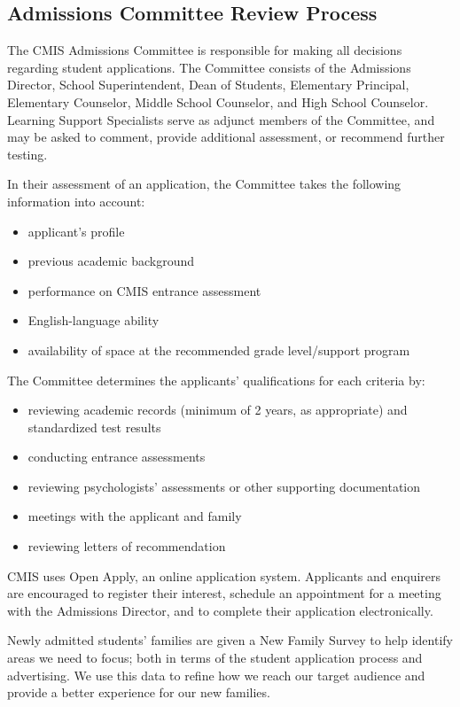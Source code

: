 \subsection{Admissions Committee Review Process}

The CMIS Admissions Committee is responsible for making all decisions regarding student applications. The Committee consists of the Admissions Director, School Superintendent, Dean of Students, Elementary Principal, Elementary Counselor, Middle School Counselor, and High School Counselor.    Learning Support Specialists serve as adjunct members of the Committee, and may be asked to comment, provide additional assessment, or recommend further testing.  

In their assessment of an application, the Committee takes the following information into account:

\begin{itemize}
\item applicant's profile
\item previous academic background
\item performance on CMIS entrance assessment
\item English-language ability
\item availability of space at the recommended grade level/support program
\end{itemize}

The Committee determines the applicants’ qualifications for each criteria by:

\begin{itemize}
\item reviewing academic records (minimum of 2 years, as appropriate) and standardized test results
\item conducting entrance assessments
\item reviewing psychologists' assessments or other supporting documentation
\item meetings with the applicant and family
\item reviewing letters of recommendation
\end{itemize}

CMIS uses Open Apply, an online application system.  Applicants and enquirers are encouraged to register their interest, schedule an appointment for a meeting with the Admissions Director, and to complete their application electronically.  

Newly admitted students’ families are given a New Family Survey to help identify areas we need to focus; both in terms of the student application process and advertising. We use this data to refine how we reach our target audience and provide a better experience for our new families.

